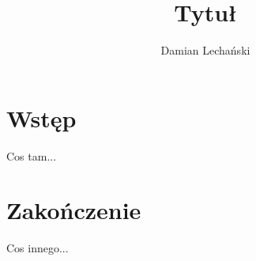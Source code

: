 \documentclass{article}
\title{Tytuł}
\author{Damian Lechański}
\begin{document}
\maketitle

\section{Wstęp}
Cos tam...

\section{Zakończenie}
Cos innego...

\tableofcontents
\end{document}
